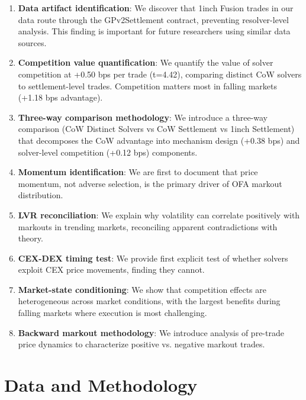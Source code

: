 \documentclass[12pt,a4paper]{article}
\begin{document}
\begin{enumerate}[leftmargin=*]
    \item \textbf{Data artifact identification}: We discover that 1inch Fusion trades in our data route through the GPv2Settlement contract, preventing resolver-level analysis. This finding is important for future researchers using similar data sources.

    \item \textbf{Competition value quantification}: We quantify the value of solver competition at +0.50 bps per trade (t=4.42), comparing distinct CoW solvers to settlement-level trades. Competition matters most in falling markets (+1.18 bps advantage).

    \item \textbf{Three-way comparison methodology}: We introduce a three-way comparison (CoW Distinct Solvers vs CoW Settlement vs 1inch Settlement) that decomposes the CoW advantage into mechanism design (+0.38 bps) and solver-level competition (+0.12 bps) components.

    \item \textbf{Momentum identification}: We are first to document that price momentum, not adverse selection, is the primary driver of OFA markout distribution.

    \item \textbf{LVR reconciliation}: We explain why volatility can correlate positively with markouts in trending markets, reconciling apparent contradictions with theory.

    \item \textbf{CEX-DEX timing test}: We provide first explicit test of whether solvers exploit CEX price movements, finding they cannot.

    \item \textbf{Market-state conditioning}: We show that competition effects are heterogeneous across market conditions, with the largest benefits during falling markets where execution is most challenging.

    \item \textbf{Backward markout methodology}: We introduce analysis of pre-trade price dynamics to characterize positive vs. negative markout trades.
\end{enumerate}

\section{Data and Methodology}
\end{document}
